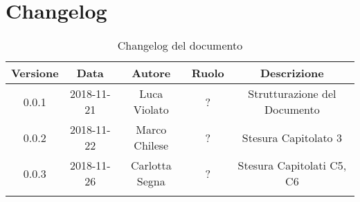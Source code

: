\section{Changelog}

\begin{center}
\begin{longtable}{|c|c|c|c|c|}
\hline
\textbf{Versione} & \textbf{Data} & \textbf{Autore} & \textbf{Ruolo} & \textbf{Descrizione} \\
\hline \hline
\endfirsthead
0.0.1 & 2018-11-21 & Luca Violato & ? & Strutturazione del Documento \\
0.0.2 & 2018-11-22 & Marco Chilese & ? & Stesura Capitolato 3 \\
0.0.3 & 2018-11-26 & Carlotta Segna & ? & Stesura Capitolati C5, C6 \\
\hline
\caption{Changelog del documento}
\end{longtable}
\end{center}
